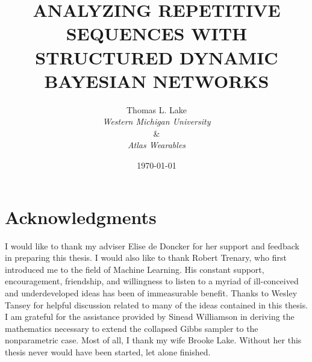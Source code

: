 \documentclass[12pt]{report}
\author{Thomas L. Lake\\\normalsize{\emph{Western Michigan University}}\\\&\\\normalsize{\emph{Atlas Wearables}}}
\title{ANALYZING REPETITIVE SEQUENCES WITH STRUCTURED DYNAMIC BAYESIAN NETWORKS}
\date{\yyyymmdddate\today}
\newcommand{\1}[0]{\mathbbm{1}}
\begin{document}



%

%
%
\chapter*{Acknowledgments}
I would like to thank my adviser Elise de Doncker for her support and feedback
in preparing this thesis.
I would also like to thank Robert Trenary, who first introduced me to the field of
Machine Learning. His constant support, encouragement, friendship, and willingness to
listen to a myriad of ill-conceived and underdeveloped ideas has been of immeasurable benefit.
Thanks to Wesley Tansey for helpful discussion related to many of the ideas contained in this thesis.
I am grateful for the assistance provided by Sinead Williamson in deriving the mathematics
necessary to extend the collapsed Gibbs sampler to the nonparametric case.
Most of all, I thank my wife Brooke Lake. Without her this thesis never would have
been started, let alone finished.
\end{document}
